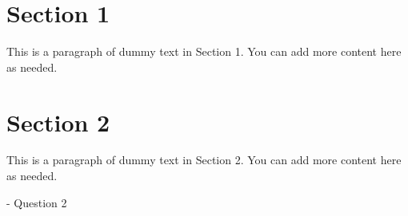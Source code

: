 \documentclass{article}
\begin{document}
\pagestyle{fancy}
\fancyhf{} %

\section{Section 1}

This is a paragraph of dummy text in Section 1. You can add more content here as needed.

\section{Section 2}

This is a paragraph of dummy text in Section 2. You can add more content here as needed.


\begin{flushright}
- Question 2 
\end{flushright}

\end{document}
